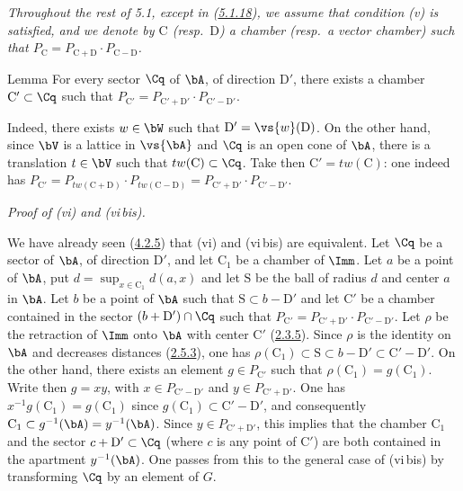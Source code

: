 \documentclass[12pt,a4paper,oneside,english]{smfart}
\makeatletter
\newcommand{\btanchor}[1]{\leavevmode\Hy@raisedlink{\hypertarget{bt:#1}{}}}
\newcommand{\btpageanchor}[1]{\Hy@raisedlink{\hypertarget{p:#1}{}}}
\newcommand{\btref}[1]{\hyperlink{bt:#1}{#1}}
\newcommand{\btpage}[1]{\marginnote{p.~#1}\btpageanchor{#1}}
\newcommand{\pg}[1]{\btpage{#1}}
\theoremstyle{definition}
\theoremstyle{bt}
\makeatother
\begin{document}
\btanchor{5.1.16}
\emph{Throughout the rest of \textup{5.1}, except in \textup{(\btref{5.1.18})}, we
assume that condition \textup{(v)} is satisfied, and we denote by $\mathrm{C}$
(resp.\ $\mathrm{D}$) a chamber (resp.\ a vector chamber) such that
$P_{\mathrm{C}}=P_{\mathrm{C}+\mathrm{D}}\cdot P_{\mathrm{C}-\mathrm{D}}$.}

\pg{88}
\begin{btstatu}{Lemma}
For every sector $\Cq$ of $\bA$, of direction $\mathrm{D}'$, there exists a
chamber $\mathrm{C}'\subset\Cq$ such that
$P_{\mathrm{C}'}=P_{\mathrm{C}'+\mathrm{D}'}\cdot P_{\mathrm{C}'-\mathrm{D}'}$.
\end{btstatu}

Indeed, there exists $w\in\bW$ such that $\mathrm{D}'=\vs{w}(\mathrm{D})$. On the
other hand, since $\bV$ is a lattice in $\vs{\bA}$ and $\Cq$ is an open cone of
$\bA$, there is a translation $t\in\bV$ such that $tw(\mathrm{C})\subset\Cq$.
Take then $\mathrm{C}'=tw(\mathrm{C})$: one indeed has
$P_{\mathrm{C}'}=P_{tw(\mathrm{C}+\mathrm{D})}\cdot P_{tw(\mathrm{C}-\mathrm{D})}
=P_{\mathrm{C}'+\mathrm{D}'}\cdot P_{\mathrm{C}'-\mathrm{D}'}$.

\btanchor{5.1.17}
\emph{Proof of \textup{(vi)} and \textup{(vi\,bis)}.}

We have already seen (\btref{4.2.5}) that (vi) and (vi\,bis) are equivalent. Let $\Cq$
be a sector of $\bA$, of direction $\mathrm{D}'$, and let $\mathrm{C}_{1}$ be a
chamber of $\Imm$. Let $a$ be a point of $\bA$, put
$d=\sup_{x\in \mathrm{C}_{1}}d(a,x)$ and let $\mathrm{S}$ be the ball of radius
$d$ and center $a$ in $\bA$. Let $b$ be a point of $\bA$ such that
$\mathrm{S}\subset b-\mathrm{D}'$ and let $\mathrm{C}'$ be a chamber contained
in the sector $(b+\mathrm{D}')\cap\Cq$ such that
$P_{\mathrm{C}'}=P_{\mathrm{C}'+\mathrm{D}'}\cdot P_{\mathrm{C}'-\mathrm{D}'}$.
Let $\rho$ be the retraction of $\Imm$ onto $\bA$ with center $\mathrm{C}'$
(\btref{2.3.5}). Since $\rho$ is the identity on $\bA$ and decreases distances (\btref{2.5.3}),
one has
$\rho(\mathrm{C}_{1})\subset \mathrm{S}\subset b-\mathrm{D}'\subset \mathrm{C}'-\mathrm{D}'$.
On the other hand, there exists an element $g\in P_{\mathrm{C}'}$ such that
$\rho(\mathrm{C}_{1})=g(\mathrm{C}_{1})$. Write then $g=xy$, with
$x\in P_{\mathrm{C}'-\mathrm{D}'}$ and $y\in P_{\mathrm{C}'+\mathrm{D}'}$. One
has $x^{-1}g(\mathrm{C}_{1})=g(\mathrm{C}_{1})$ since
$g(\mathrm{C}_{1})\subset \mathrm{C}'-\mathrm{D}'$, and consequently
$\mathrm{C}_{1}\subset g^{-1}(\bA)=y^{-1}(\bA)$. Since
$y\in P_{\mathrm{C}'+\mathrm{D}'}$, this implies that the chamber
$\mathrm{C}_{1}$ and the sector $c+\mathrm{D}'\subset\Cq$ (where $c$ is any
point of $\mathrm{C}'$) are both contained in the apartment $y^{-1}(\bA)$. One
passes from this to the general case of (vi\,bis) by transforming $\Cq$ by an
element of $G$.
\end{document}
